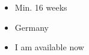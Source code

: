 


\twocolumnsection
{
	\begin{skills}
	\end{skills}
}
{
	\vspace{1ex}
	\begin{itemize}
		\item Min. 16 weeks  
		\item Germany          
		\item I am available now
	\end{itemize}
}

